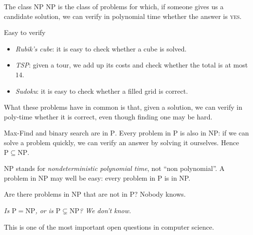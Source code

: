 \documentclass[a4paper,12pt,oneside]{report}
\begin{document}
\begin{frameddefn}{The class NP}\label{def:class-np}
$\mathrm{NP}$ is the class of problems for which, if someone gives us
a candidate solution, we can verify in polynomial time whether the
answer is \textsc{yes}.
\end{frameddefn}

\begin{framedexample}{Easy to verify}\label{ex:np-verify}
\begin{itemize}
  \item \emph{Rubik's cube}: it is easy to check whether a cube is
    solved.
  \item \emph{TSP}: given a tour, we add up its costs and check whether
    the total is at most $14$.
  \item \emph{Sudoku}: it is easy to check whether a filled grid is
    correct.
\end{itemize}
What these problems have in common is that, given a solution, we can
verify in poly-time whether it is correct, even though finding one may
be hard.
\end{framedexample}

Max-Find and binary search are in $\mathrm{P}$. Every problem in
$\mathrm{P}$ is also in $\mathrm{NP}$: if we can solve a problem
quickly, we can verify an answer by solving it ourselves. Hence
$\mathrm{P}\subseteq\mathrm{NP}$.

\begin{notebox}
NP stands for \emph{nondeterministic polynomial time}, not ``non
polynomial''. A problem in NP may well be easy: every problem in P is
in NP.
\end{notebox}

Are there problems in NP that are not in P? Nobody knows.
\begin{center}
\emph{Is $\mathrm{P}=\mathrm{NP}$, or is $\mathrm{P}\subsetneq\mathrm{NP}$?
We don't know.}
\end{center}
This is one of the most important open questions in computer science.

\begin{center}
\end{center}
\end{document}
